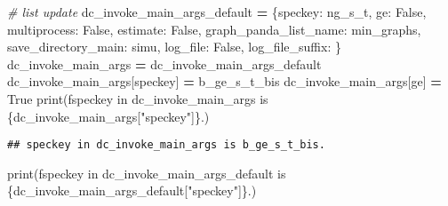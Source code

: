 \documentclass[
]{book}
\newenvironment{Shaded}{\begin{snugshade}}{\end{snugshade}}
\newcommand{\BuiltInTok}[1]{#1}
\newcommand{\CommentTok}[1]{\textcolor[rgb]{0.56,0.35,0.01}{\textit{#1}}}
\newcommand{\NormalTok}[1]{#1}
\newcommand{\OperatorTok}[1]{\textcolor[rgb]{0.81,0.36,0.00}{\textbf{#1}}}
\newcommand{\SpecialCharTok}[1]{\textcolor[rgb]{0.00,0.00,0.00}{#1}}
\newcommand{\SpecialStringTok}[1]{\textcolor[rgb]{0.31,0.60,0.02}{#1}}
\newcommand{\StringTok}[1]{\textcolor[rgb]{0.31,0.60,0.02}{#1}}
\newcommand{\VariableTok}[1]{\textcolor[rgb]{0.00,0.00,0.00}{#1}}
\begin{document}
\begin{Shaded}
\begin{Highlighting}[]
\CommentTok{\# list update}
\NormalTok{dc\_invoke\_main\_args\_default }\OperatorTok{=}\NormalTok{ \{}\StringTok{\textquotesingle{}speckey\textquotesingle{}}\NormalTok{: }\StringTok{\textquotesingle{}ng\_s\_t\textquotesingle{}}\NormalTok{,}
                               \StringTok{\textquotesingle{}ge\textquotesingle{}}\NormalTok{: }\VariableTok{False}\NormalTok{,}
                               \StringTok{\textquotesingle{}multiprocess\textquotesingle{}}\NormalTok{: }\VariableTok{False}\NormalTok{,}
                               \StringTok{\textquotesingle{}estimate\textquotesingle{}}\NormalTok{: }\VariableTok{False}\NormalTok{,}
                               \StringTok{\textquotesingle{}graph\_panda\_list\_name\textquotesingle{}}\NormalTok{: }\StringTok{\textquotesingle{}min\_graphs\textquotesingle{}}\NormalTok{,}
                               \StringTok{\textquotesingle{}save\_directory\_main\textquotesingle{}}\NormalTok{: }\StringTok{\textquotesingle{}simu\textquotesingle{}}\NormalTok{,}
                               \StringTok{\textquotesingle{}log\_file\textquotesingle{}}\NormalTok{: }\VariableTok{False}\NormalTok{,}
                               \StringTok{\textquotesingle{}log\_file\_suffix\textquotesingle{}}\NormalTok{: }\StringTok{\textquotesingle{}\textquotesingle{}}\NormalTok{\}}
\NormalTok{dc\_invoke\_main\_args }\OperatorTok{=}\NormalTok{ dc\_invoke\_main\_args\_default}
\NormalTok{dc\_invoke\_main\_args[}\StringTok{\textquotesingle{}speckey\textquotesingle{}}\NormalTok{] }\OperatorTok{=} \StringTok{\textquotesingle{}b\_ge\_s\_t\_bis\textquotesingle{}}
\NormalTok{dc\_invoke\_main\_args[}\StringTok{\textquotesingle{}ge\textquotesingle{}}\NormalTok{] }\OperatorTok{=} \VariableTok{True}
\BuiltInTok{print}\NormalTok{(}\SpecialStringTok{f\textquotesingle{}speckey in dc\_invoke\_main\_args is }\SpecialCharTok{\{}\NormalTok{dc\_invoke\_main\_args[}\StringTok{"speckey"}\NormalTok{]}\SpecialCharTok{\}}\SpecialStringTok{.\textquotesingle{}}\NormalTok{)}
\end{Highlighting}
\end{Shaded}

\begin{verbatim}
## speckey in dc_invoke_main_args is b_ge_s_t_bis.
\end{verbatim}

\begin{Shaded}
\begin{Highlighting}[]
\BuiltInTok{print}\NormalTok{(}\SpecialStringTok{f\textquotesingle{}speckey in dc\_invoke\_main\_args\_default is }\SpecialCharTok{\{}\NormalTok{dc\_invoke\_main\_args\_default[}\StringTok{"speckey"}\NormalTok{]}\SpecialCharTok{\}}\SpecialStringTok{.\textquotesingle{}}\NormalTok{)}
\end{Highlighting}
\end{Shaded}
\end{document}
